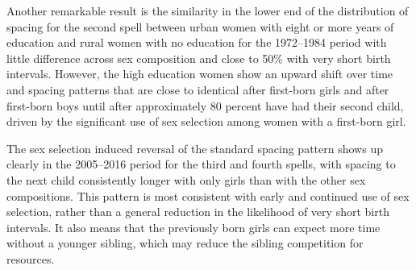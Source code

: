 \documentclass[12pt,letterpaper]{article}
\begin{document}
Another remarkable result is the similarity in the lower end of the distribution of
spacing for the second spell between urban women with eight or more years of education and 
rural women with no education for the 1972--1984 period with little difference across
sex composition and close to 50\% with very short birth intervals.
However, the high education women show an upward shift over time and spacing patterns that
are close to identical after first-born girls and after first-born boys until after 
approximately 80 percent have had their second child, driven by the significant use of sex 
selection among women with a first-born girl.

The sex selection induced reversal of the standard spacing pattern shows up clearly in the 
2005--2016 period for the third and fourth spells, with spacing to the next child 
consistently longer with only girls than with the other sex compositions.
This pattern is most consistent with early and continued use of sex selection, rather 
than a general reduction in the likelihood of very short birth intervals.
It also means that the previously born girls can expect more time without a younger 
sibling, which may reduce the sibling competition for resources.


% 
\end{document}
